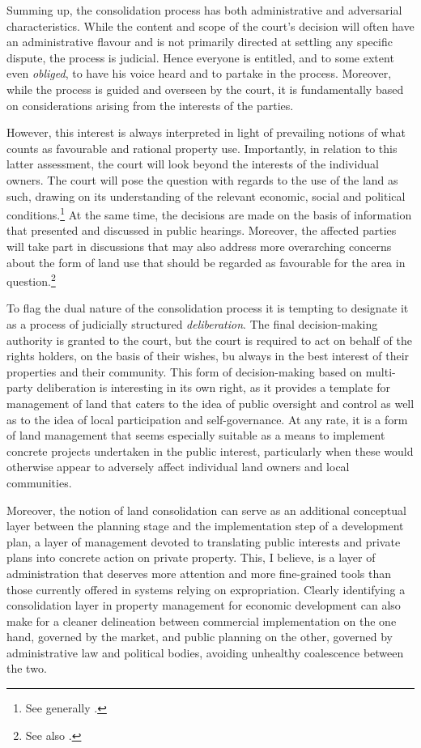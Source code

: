 Summing up, the consolidation process has both administrative and adversarial characteristics. While the content and scope of the court's decision will often have an administrative flavour and is not primarily directed at settling any specific dispute, the process is judicial. Hence everyone is entitled, and to some extent even \emph{obliged}, to have his voice heard and to partake in the process. Moreover, while the process is guided and overseen by the court, it is fundamentally based on considerations arising from the interests of the parties. 

However, this interest is always interpreted in light of prevailing notions of what counts as favourable and rational property use. Importantly, in relation to this latter assessment, the court will look beyond the interests of the individual owners. The court will pose the question with regards to the use of the land as such, drawing on its understanding of the relevant economic, social and political conditions.\footnote{See generally \cite{reiten09,sky09}.} At the same time, the decisions are made on the basis of information that presented and discussed in public hearings. Moreover, the affected parties will take part in discussions that may also address more overarching concerns about the form of land use that should be regarded as favourable for the area in question.\footnote{See also \cite{rognes07}.}

To flag the dual nature of the consolidation process it is tempting to designate it as a process of judicially structured \emph{deliberation}. The final decision-making authority is granted to the court, but the court is required to act on behalf of the rights holders, on the basis of their wishes, bu always in the best interest of their properties and their community. This form of decision-making based on multi-party deliberation is interesting in its own right, as it provides a template for management of land that caters to the idea of public oversight and control as well as to the idea of local participation and self-governance. At any rate, it is a form of land management that seems especially suitable as a means to implement concrete projects undertaken in the public interest, particularly when these would otherwise appear to adversely affect individual land owners and local communities.

Moreover, the notion of land consolidation can serve as an additional conceptual layer between the planning stage and the implementation step of a development plan, a layer of management devoted to translating public interests and private plans into concrete action on private property. This, I believe, is a layer of administration that deserves more attention and more fine-grained tools than those currently offered in systems relying on expropriation. Clearly identifying a consolidation layer in property management for economic development can also make for a cleaner delineation between commercial implementation on the one hand, governed by the market, and public planning on the other, governed by administrative law and political bodies, avoiding unhealthy coalescence between the two.

